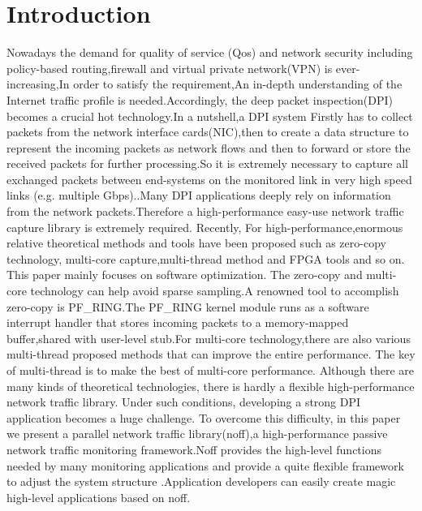 \documentclass[conference]{IEEEtran}
\begin{document}
\section{Introduction}
Nowadays the demand for quality of service (Qos) and network security including policy-based routing,firewall and virtual private network(VPN) is ever-increasing\cite{Liu},In order to satisfy the requirement,An in-depth understanding of the Internet traffic profile is needed.Accordingly, the deep packet inspection(DPI) becomes a crucial hot technology\cite{Antonello}.In a nutshell,a DPI system Firstly has to collect packets from the network interface cards(NIC),then to create a data structure to represent the incoming packets as network flows and then to forward or store the received packets for further processing.So it is extremely necessary to capture all exchanged packets between end-systems on the monitored link in very high speed links (e.g. multiple Gbps).\cite{Antonello}.Many DPI applications deeply rely on information from the network packets.Therefore a high-performance easy-use network traffic capture library is extremely required.
\newline\indent Recently, For high-performance,enormous relative theoretical methods and tools have been proposed such as zero-copy technology, multi-core capture,multi-thread method and FPGA tools\cite{Qiao} and so on. This paper mainly focuses on software optimization.
The zero-copy and multi-core technology can help avoid sparse sampling\cite{Ali}.A renowned tool to accomplish zero-copy is PF\_RING\cite{PFRING}.The PF\_RING kernel module runs as a software interrupt handler that stores incoming packets to a memory-mapped buffer,shared with user-level stub.For multi-core technology,there are also various multi-thread proposed methods that can improve the entire performance.
The key of multi-thread is to make the best of multi-core performance.
\newline\indent Although there are many kinds of theoretical technologies, there is hardly a flexible high-performance network traffic library. Under such conditions, developing a strong DPI application becomes a huge challenge.
\newline\indent To overcome this difficulty, in this paper we present a parallel network traffic library(noff),a high-performance passive network traffic monitoring framework.Noff provides the high-level functions needed by many monitoring applications and provide a quite flexible framework to adjust the system structure .Application developers can easily create magic high-level applications based on noff.
\end{document}
